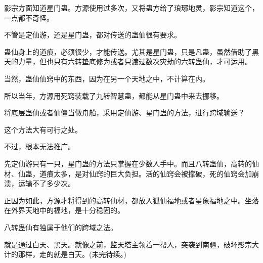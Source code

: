 \begin{this_body}
影宗方面知道星门蛊。方源使用过多次，又将蛊方给了琅琊地灵，影宗知道这个，一点都不奇怪。

不管是定仙游，还是星门蛊，都对传送的蛊仙很有要求。

蛊仙身上的道痕，必须很少，才能传送。尤其是星门蛊，只是凡蛊，虽然借助了黑天的力量，但也只有六转垫底修为或者只渡过数次灾劫的六转蛊仙，才可运用。

当然，蛊仙仙窍中的东西，因为在另一个天地之中，不计算在内。

所以当年，方源用死窍装载了九转智慧蛊，都能从星门蛊中来去挪移。

将底层蛊仙或者仙僵当做舟船，采用定仙游、星门蛊的方法，进行跨域输送？

这个方法大有可行之处。

不过，根本无法推广。

先定仙游只有一只，星门蛊的方法只掌握在少数人手中。而且八转蛊仙，高转的仙材、仙蛊，道痕太多，是对仙窍的巨大负担。活的仙窍会被撑破，死的仙窍会加崩溃，运输不了多少次。

正因为如此，方源才将得到的高转仙材，都放入狐仙福地或者星象福地之中。坐落在外界天地中的福地，是十分稳固的。

八转蛊仙有独属于他们的跨域之法。

就是通过白天、黑天。就像之前，监天塔主领着一帮人，突袭到南疆，破坏影宗大计的那样，走的就是白天。(未完待续。)

\end{this_body}

